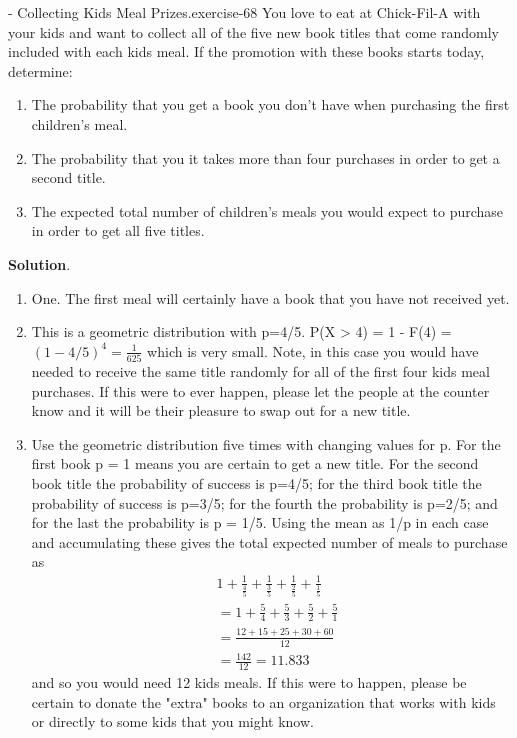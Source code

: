 \documentclass[10pt,]{book}
\numberwithin{equation}{section}
\begin{document}
\begin{inlineexercise}{- Collecting Kids Meal Prizes.}{exercise-68}%
\hypertarget{p-1020}{}%
You love to eat at Chick-Fil-A with your kids and want to collect all of the five new book titles that come randomly included with each kids meal.  If the promotion with these books starts today, determine: \leavevmode%
\begin{enumerate}
\item\hypertarget{li-274}{}The probability that you get a book you don't have when purchasing the first children's meal.%
\item\hypertarget{li-275}{}The probability that you it takes more than four purchases in order to get a second title.%
\item\hypertarget{li-276}{}The expected total number of children's meals you would expect to purchase in order to get all five titles.%
\end{enumerate}
%
\textbf{Solution}.\quad%
\hypertarget{p-1021}{}%
\leavevmode%
\begin{enumerate}
\item\hypertarget{li-277}{}One. The first meal will certainly have a book that you have not received yet.%
\item\hypertarget{li-278}{}This is a geometric distribution with p=4/5.  P(X > 4) = 1 - F(4) = \((1 - 4/5)^4 = \frac{1}{625}\) which is very small. Note, in this case you would have needed to receive the same title randomly for all of the first four kids meal purchases. If this were to ever happen, please let the people at the counter know and it will be their pleasure to swap out for a new title.%
\item\hypertarget{li-279}{}Use the geometric distribution five times with changing values for p. For the first book p = 1 means you are certain to get a new title. For the second book title the probability of success is p=4/5; for the third book title the probability of success is p=3/5; for the fourth the probability is p=2/5; and for the last the probability is p = 1/5. Using the mean as 1/p in each case and accumulating these gives the total expected number of meals to purchase as%
\begin{align*}
& 1 + \frac{1}{\frac{4}{5}} + \frac{1}{\frac{3}{5}} + \frac{1}{\frac{2}{5}} + \frac{1}{\frac{1}{5}} \\
& = 1 + \frac{5}{4} + \frac{5}{3} + \frac{5}{2} + \frac{5}{1} \\
& = \frac{12 + 15 + 25 + 30 + 60}{12} \\
& = \frac{142}{12} = 11.833
\end{align*}
and so you would need 12 kids meals.  If this were to happen, please be certain to donate the "extra" books to an organization that works with kids or directly to some kids that you might know.%
\end{enumerate}
%
\end{inlineexercise}
\end{document}
